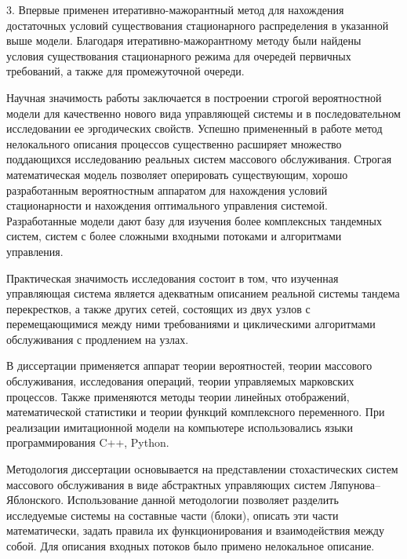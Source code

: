 3. Впервые применен итеративно-мажорантный метод для нахождения достаточных условий существования стационарного распределения в указанной выше модели. Благодаря итеративно-мажорантному методу были найдены условия существования стационарного режима для очередей первичных требований, а также для промежуточной очереди.






{\influence} Научная значимость работы заключается в построении строгой вероятностной модели 
для качественно нового вида управляющей системы и в последовательном исследовании ее эргодических свойств. Успешно примененный в работе метод нелокального описания процессов существенно расширяет множество поддающихся исследованию реальных систем массового обслуживания. Строгая математическая модель позволяет оперировать существующим, хорошо разработанным вероятностным аппаратом для нахождения условий стационарности и нахождения оптимального управления системой. 
 Разработанные модели дают базу для изучения более комплексных тандемных систем, систем с более сложными входными потоками и алгоритмами управления.

Практическая значимость исследования состоит в том, что изученная управляющая система является адекватным описанием реальной системы тандема перекрестков, а также других сетей, состоящих из двух узлов с перемещающимися между ними требованиями и циклическими алгоритмами обслуживания с продлением на узлах.




{\methods} 
В диссертации применяется аппарат теории вероятностей, теории массового обслуживания, исследования операций, теории управляемых марковских процессов. Также применяются методы теории линейных отображений, математической статистики и теории функций комплексного переменного.
 При реализации имитационной модели на компьютере использовались языки программирования C++, Python.

Методология диссертации основывается на   представлении стохастических систем массового обслуживания в виде абстрактных управляющих систем Ляпунова--Яблонского. Использование данной методологии  позволяет разделить исследуемые системы на составные части (блоки), описать эти части математически,  задать правила их функционирования и взаимодействия между собой.
Для описания входных потоков было примено нелокальное описание.

